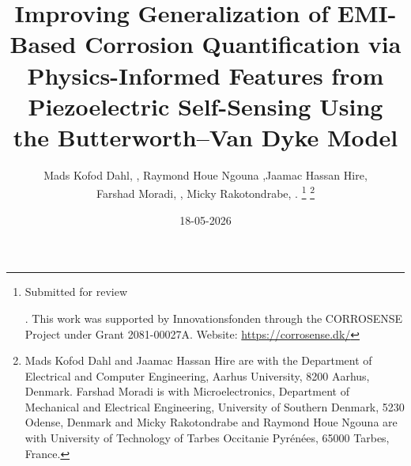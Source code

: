 \documentclass[journal,twoside,web]{ieeecolor}
\begin{document}
\title{Improving Generalization of EMI-Based Corrosion Quantification via Physics-Informed Features from Piezoelectric Self-Sensing Using the Butterworth–Van Dyke Model}
\author{Mads Kofod Dahl, , Raymond Houe Ngouna ,Jaamac Hassan Hire, \\Farshad Moradi, , Micky Rakotondrabe, .
\thanks{Submitted for review \date{18-05-2026}. This work was supported by Innovationsfonden through the CORROSENSE Project under Grant 2081-00027A. Website: \url{https://corrosense.dk/}}
\thanks{Mads Kofod Dahl and Jaamac Hassan Hire are with the Department of Electrical and Computer Engineering, Aarhus University, 8200 Aarhus, Denmark. Farshad Moradi is with Microelectronics, Department of Mechanical and Electrical Engineering, University of Southern Denmark, 5230 Odense, Denmark and Micky Rakotondrabe and Raymond Houe Ngouna are with University of Technology of Tarbes Occitanie Pyrénées, 65000 Tarbes, France.}}
\end{document}
